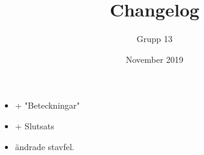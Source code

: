 \documentclass{article}
\title{Changelog}
\author{Grupp 13}
\date{November 2019}
\begin{document}
\maketitle
\begin{itemize}
    \item + "Beteckningar"
    \item + Slutsats
    \item ändrade stavfel.
\end{itemize}
\end{document}
